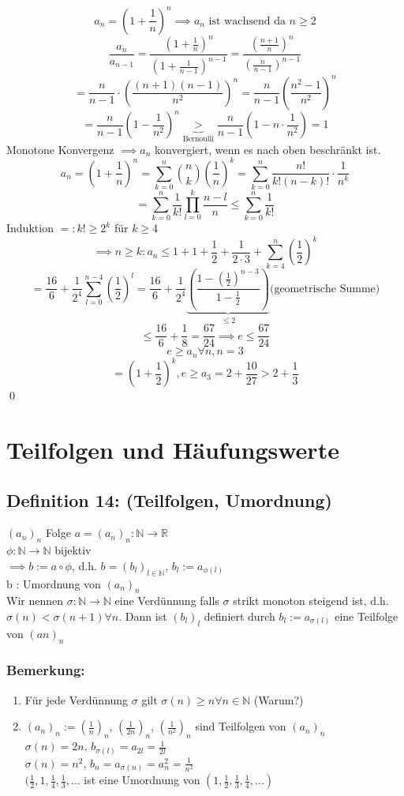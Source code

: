 \documentclass[fleqn]{scrbook}
\renewenvironment{proof}{{\bfseries Beweis }}{\qed}
\begin{document}
\begin{proof}
\[a_n = (1 + \frac{1}{n})^n \implies a_n\text{ ist wachsend da } n\geq 2\]
\[\frac{a_n}{a_{n-1}} = \frac{(1+\frac{1}{n})^n}{(1+\frac{1}{n-1})^{n-1}} = \frac{(\frac{n+1}{n})^n}{(\frac{n}{n-1})^{n-1}}\]
\[= \frac{n}{n-1}  \cdot  (\frac{(n+1)(n-1)}{n^2})^n = \frac{n}{n-1} (\frac{n^2 - 1}{n^2})^n\]
\[= \frac{n}{n-1} (1-\frac{1}{n^2})^n \underbrace{>}_{\text{Bernoulli}} \frac{n}{n-1} (1 - n  \cdot  \frac{1}{n^2}) = 1\]
Monotone Konvergenz $\implies a_n$ konvergiert, wenn es nach oben beschränkt ist.
\[a_n = (1 + \frac{1}{n})^n = \sum_{k = 0}^n \binom{n}{k} (\frac{1}{n})^k = \sum_{k=0}^n \frac{n!}{k!(n-k)!}  \cdot  \frac{1}{n^k}\]
\[= \sum_{k =0}^n \frac{1}{k!} \prod_{l=0}^k \frac{n-l}{n} \leq \sum_{k=0}^n \frac{1}{k!}\]
Induktion $=: k! \geq 2^k$ für $k\geq 4$
\[\implies n \geq k: a_n \leq 1 + 1 + \frac{1}{2} +  \frac{1}{2  \cdot  3} + \sum_{k = 4}^n (\frac{1}{2})^k\]
\[= \frac{16}{6} + \frac{1}{2^4} \sum_{l = 0}^{n-4} (\frac{1}{2})^l = \frac{16}{6} + \frac{1}{2^4} \underbrace{(\frac{1-(\frac{1}{2})^{n-3}}{1-\frac{1}{2}})}_{\leq 2} \text{(geometrische Summe)}\]
\[\leq \frac{16}{6} + \frac{1}{8} = \frac{67}{24} \implies e \leq \frac{67}{24}\]
\[e \geq a_n \forall n, n = 3\]
\[=(1 + \frac{1}{2})^k, e \geq a_3 = 2 + \frac{10}{27} > 2 + \frac{1}{3}\]
\end{proof}
\section{Teilfolgen und Häufungswerte}
\subsection{Definition 14: (Teilfolgen, Umordnung)} $(a_n)_n$ Folge $a = (a_n)_{n}: \mathbb{N} \rightarrow \mathbb{R}$\\
$\phi : \mathbb{N} \rightarrow \mathbb{N}$ bijektiv\\
$\implies b:= a \circ \phi$, d.h. $b = (b_l)_{l\in\mathbb{N}}$, $b_l := a_{\phi (l)}$\\
b : Umordnung von $(a_n)_n$\\
Wir nennen $\sigma : \mathbb{N} \rightarrow \mathbb{N}$ eine Verdünnung falls $\sigma$ strikt monoton steigend ist, d.h. $\sigma (n) < \sigma (n+1) \forall n$. Dann ist $(b_l)_l$ definiert durch $b_l := a_{\sigma (l)}$ eine Teilfolge von $(an)_n$
\subsubsection{Bemerkung:}
\begin{enumerate}[1)]
\item Für jede Verdünnung $\sigma$ gilt $\sigma (n) \geq n \forall n \in \mathbb{N}$ (Warum?)
\item $(a_n)_n := (\frac{1}{n})_n$, $(\frac{1}{2n})_n$, $(\frac{1}{n^2})_n$ sind Teilfolgen von $(a_n)_n$\\
$\sigma(n) = 2n$, $b_{\sigma(l)} = a_{2l} = \frac{1}{2l}$\\
$\sigma(n) = n^2$, $b_n = a_{\sigma(n)} = a_n^2 = \frac{1}{n^2}$\\
$(\frac{1}{2}, 1, \frac{1}{4}, \frac{1}{3}, \ldots$ ist eine Umordnung von $(1, \frac{1}{2}, \frac{1}{3}, \frac{1}{4}, \ldots)$
\end{enumerate}
\end{document}
